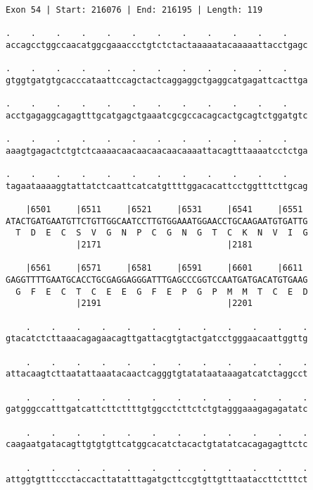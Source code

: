 \documentclass{article}
\begin{document}
\begin{Verbatim}
Exon 54 | Start: 216076 | End: 216195 | Length: 119
 
.    .    .    .    .    .    .    .    .    .    .    .    
accagcctggccaacatggcgaaaccctgtctctactaaaaatacaaaaattacctgagc
  
.    .    .    .    .    .    .    .    .    .    .    .    
gtggtgatgtgcacccataattccagctactcaggaggctgaggcatgagattcacttga
  
.    .    .    .    .    .    .    .    .    .    .    .    
acctgagaggcagagtttgcatgagctgaaatcgcgccacagcactgcagtctggatgtc
  
.    .    .    .    .    .    .    .    .    .    .    .    
aaagtgagactctgtctcaaaacaacaacaacaacaaaattacagtttaaaatcctctga
  
.    .    .    .    .    .    .    .    .    .    .    .    
tagaataaaaggtattatctcaattcatcatgttttggacacattcctggtttcttgcag
  
    |6501     |6511     |6521     |6531     |6541     |6551 
ATACTGATGAATGTTCTGTTGGCAATCCTTGTGGAAATGGAACCTGCAAGAATGTGATTG
  T  D  E  C  S  V  G  N  P  C  G  N  G  T  C  K  N  V  I  G
              |2171                         |2181           
  
    |6561     |6571     |6581     |6591     |6601     |6611 
GAGGTTTTGAATGCACCTGCGAGGAGGGATTTGAGCCCGGTCCAATGATGACATGTGAAG
  G  F  E  C  T  C  E  E  G  F  E  P  G  P  M  M  T  C  E  D
              |2191                         |2201           
  
    .    .    .    .    .    .    .    .    .    .    .    .
gtacatctcttaaacagagaacagttgattacgtgtactgatcctgggaacaattggttg
  
    .    .    .    .    .    .    .    .    .    .    .    .
attacaagtcttaatattaaatacaactcagggtgtatataataaagatcatctaggcct
  
    .    .    .    .    .    .    .    .    .    .    .    .
gatgggccatttgatcattcttcttttgtggcctcttctctgtagggaaagagagatatc
  
    .    .    .    .    .    .    .    .    .    .    .    .
caagaatgatacagttgtgtgttcatggcacatctacactgtatatcacagagagttctc
  
    .    .    .    .    .    .    .    .    .    .    .    .
attggtgtttccctaccacttatatttagatgcttccgtgttgtttaataccttctttct
\end{Verbatim}
\newpage
\end{document}
